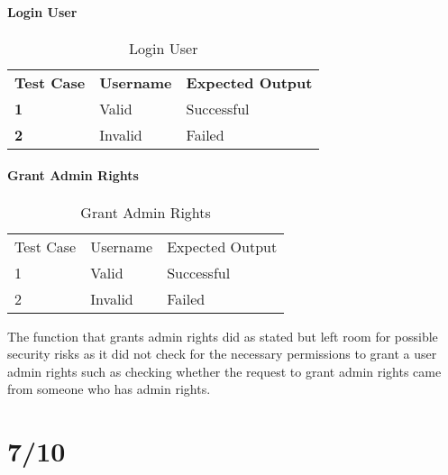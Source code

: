 \subsection{Login User}
\begin{table}[]
\centering
\caption{Login User}
\begin{tabular}{@{}lll@{}}
\textbf{Test Case} & \textbf{Username} & \textbf{Expected Output} \\
\textbf{1}         & Valid             & Successful               \\
\textbf{2}         & Invalid           & Failed                  
\end{tabular}
\end{table}

\subsection{Grant Admin Rights}
\begin{table}[]
\centering
\caption{Grant Admin Rights}
\label{my-label}
\begin{tabular}{@{}lll@{}}
Test Case & Username & Expected Output \\
1         & Valid    & Successful      \\
2         & Invalid  & Failed         
\end{tabular}
\end{table}
The function that grants admin rights did as stated but left room for possible security risks as it did not check for the necessary permissions to grant a user admin rights such as checking whether the request to grant admin rights came from someone who has admin rights.
\part*{7/10}
\subsection{}
